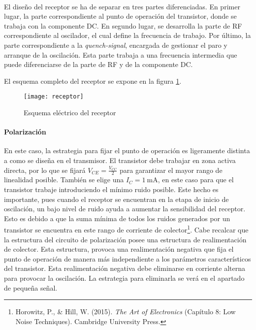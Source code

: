 \paragraph{}
El diseño del receptor se ha de separar en tres partes diferenciadas.
En primer lugar, la parte correspondiente al punto de operación del transistor, donde se trabaja con la componente DC.
En segundo lugar, se desarrolla la parte de RF correspondiente al oscilador, el cual define la frecuencia de trabajo. 
Por último, la parte correspondiente a la \textit{quench-signal}, encargada de gestionar el paro y arranque de la oscilación. Esta parte trabaja a una frecuencia intermedia que puede diferenciarse de la parte de RF y de la componente DC.

El esquema completo del receptor se expone en la figura \ref{fig:rx}.
\begin{figure}[h]
    \centering
    \texttt{[image: receptor]}
    \caption{Esquema el\'ectrico del receptor}
    \label{fig:rx}
\end{figure}

\paragraph{Polarización} %
En este caso, la estrategia para fijar el punto de operación es ligeramente distinta a como se diseña en el transmisor. 
El transistor debe trabajar en zona activa directa, por lo que se fijará $V_{CE} = \frac{V_{CC}}{2}$ para garantizar el mayor rango de linealidad posible.
También se elige una $I_C = \SI{1}{\milli\ampere}$, en este caso para que el transistor trabaje introduciendo el mínimo ruido posible.
Este hecho es importante, pues cuando el receptor se encuentran en la etapa de inicio de oscilación, un bajo nivel de ruido ayuda a aumentar la sensibilidad del receptor. Esto es debido a que la suma mínima de todos los ruidos generados por un transistor se encuentra en este rango de corriente de colector\footnote{Horowitz, P., \& Hill, W. (2015). \textit{The Art of Electronics} (Capítulo 8: Low Noise Techniques). Cambridge University Press.}.
Cabe recalcar que la estructura del circuito de polarización posee una estructura de realimentación de colector. Esta estructura, provoca una realimentación negativa que fija el punto de operación de manera más independiente a los parámetros característicos del transistor. Esta realimentación negativa debe eliminarse en corriente alterna para provocar la oscilación. La estrategia para eliminarla se verá en el apartado de pequeña señal.
